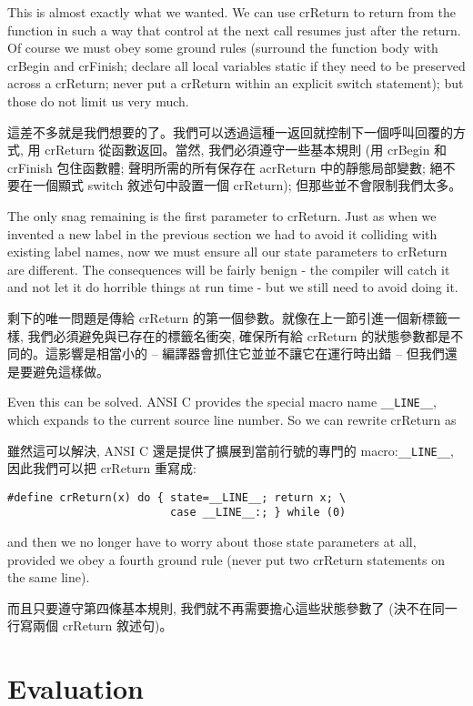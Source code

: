 \documentclass[12pt]{article}
\begin{document}
\begin{CJK}{UTF8}{bsmi}
This is almost exactly what we wanted. We can use crReturn to return from the function in such a way that control at the next call resumes just after the return. Of course we must obey some ground rules (surround the function body with crBegin and crFinish; declare all local variables static if they need to be preserved across a crReturn; never put a crReturn within an explicit switch statement); but those do not limit us very much.

這差不多就是我們想要的了。我們可以透過這種一返回就控制下一個呼叫回覆的方式, 用 crReturn
從函數返回。當然, 我們必須遵守一些基本規則 (用 crBegin 和 crFinish 包住函數體; 聲明所需的所有保存在
acrReturn 中的靜態局部變數; 絕不要在一個顯式 switch 敘述句中設置一個 crReturn); 但那些並不會限制我們太多。

The only snag remaining is the first parameter to crReturn. Just as when we invented a new label in the previous section we had to avoid it colliding with existing label names, now we must ensure all our state parameters to crReturn are different. The consequences will be fairly benign - the compiler will catch it and not let it do horrible things at run time - but we still need to avoid doing it.

剩下的唯一問題是傳給 crReturn 的第一個參數。就像在上一節引進一個新標籤一樣, 我們必須避免與已存在的標籤名衝突, 確保所有給 crReturn 的狀態參數都是不同的。這影響是相當小的 -- 編譯器會抓住它並並不讓它在運行時出錯 -- 但我們還是要避免這樣做。

Even this can be solved. ANSI C provides the special macro name \verb+__LINE__+, which expands to the current source line number. So we can rewrite crReturn as

雖然這可以解決, ANSI C 還是提供了擴展到當前行號的專門的 macro:\verb+__LINE__+, 因此我們可以把 crReturn 重寫成:

\begin{lstlisting}[basicstyle=\footnotesize, breaklines=true]
#define crReturn(x) do { state=__LINE__; return x; \
                         case __LINE__:; } while (0)
\end{lstlisting}

and then we no longer have to worry about those state parameters at all, provided we obey a fourth ground rule (never put two crReturn statements on the same line).

而且只要遵守第四條基本規則, 我們就不再需要擔心這些狀態參數了 (決不在同一行寫兩個 crReturn 敘述句)。 

\section{Evaluation}


\end{CJK}
\end{document}
